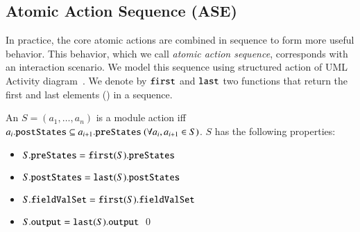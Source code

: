 \subsection{Atomic Action Sequence (ASE)} \label{sect:arch-ase}
In practice, the core atomic actions are combined in sequence to form more useful behavior. This behavior, which we call \textit{atomic action sequence}, corresponds with an interaction scenario. We model this sequence using structured action of UML Activity diagram~\cite{omg_unified_2017}. %
%
We denote by $ \func{first}$ and $ \func{last}$ two functions that return the first and last elements (\resp) in a sequence.
%
\begin{definition} \label{def:ase}
An  $S = (a_1,\dots,a_n)$ is a module action iff $a_i.{\tt postStates} \subseteq a_{i+1}.{\tt preStates} ~(\forall a_i, a_{i+1} \in S)$. %
%
$S$ has the following properties:
\begin{itemize}
\item $S.\membern{preStates} = \func{first}(S).\membern{preStates}$
\item $S.\membern{postStates} = \func{last}(S).\membern{postStates}$ 
\item $S.\membern{fieldValSet} = \func{first}(S).\membern{fieldValSet}$
\item $S.\membern{output} = \func{last}(S).\membern{output}$ \qed
\end{itemize}
\end{definition}

